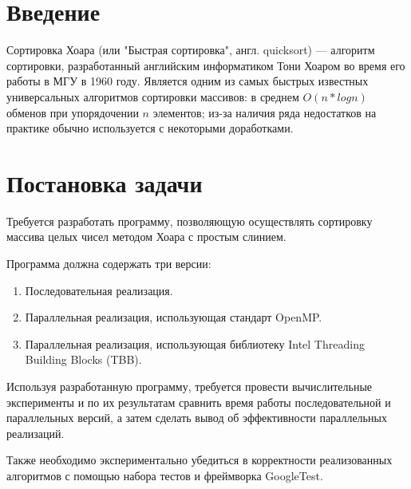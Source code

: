 \documentclass{report}
\begin{document}
\setcounter{page}{2}

\tableofcontents
\newpage

\section*{Введение}
Сортировка Хоара (или "Быстрая сортировка", англ. quicksort) — алгоритм сортировки, разработанный английским информатиком Тони Хоаром во время его работы в МГУ в 1960 году. Является одним из самых быстрых известных универсальных алгоритмов сортировки массивов: в среднем $O(n*log{n})$ обменов при упорядочении $n$ элементов; из-за наличия ряда недостатков на практике обычно используется с некоторыми доработками.

\newpage

\section*{Постановка задачи}
Требуется разработать программу, позволяющую осуществлять сортировку массива целых чисел методом Хоара с простым слинием.
\par Программа должна содержать три версии:
\begin{enumerate}
\item Последовательная реализация.
\item Параллельная реализация, использующая стандарт OpenMP.
\item Параллельная реализация, использующая библиотеку Intel Threading Building Blocks (TBB).
\end{enumerate}
\par Используя разработанную программу, требуется провести вычислительные эксперименты и по их результатам сравнить время работы последовательной и параллельных версий, а затем сделать вывод об эффективности параллельных реализаций.
\par Также необходимо экспериментально убедиться в корректности реализованных алгоритмов с помощью набора тестов и фреймворка GoogleTest.
\newpage

\end{document}

